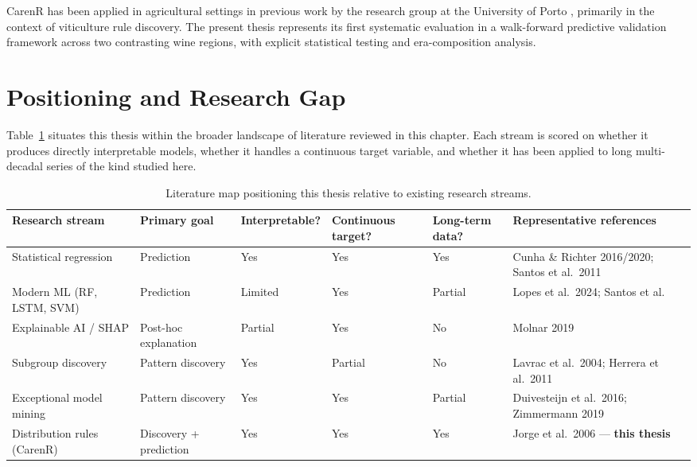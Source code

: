 CarenR has been applied in agricultural settings in previous work by the research group at the University of Porto \citep{Moreira2022}, primarily in the context of viticulture rule discovery. The present thesis represents its first systematic evaluation in a walk-forward predictive validation framework across two contrasting wine regions, with explicit statistical testing and era-composition analysis.


\section{Positioning and Research Gap}\label{sec:positioning_and_research_gap}

Table~\ref{tab:ch2a_1} situates this thesis within the broader landscape of literature reviewed in this chapter. Each stream is scored on whether it produces directly interpretable models, whether it handles a continuous target variable, and whether it has been applied to long multi-decadal series of the kind studied here.

\begin{table}[htbp]
  \centering
  \caption{Literature map positioning this thesis relative to existing research streams.}\label{tab:ch2a_1}
  \small
  \renewcommand{\arraystretch}{1.1}
  \begin{adjustbox}{max width=\textwidth}
  \begin{tabularx}{\textwidth}{>{\raggedright}p{2.6cm} >{\raggedright}p{2.1cm} >{\centering}p{2cm} >{\centering}p{1.9cm} >{\centering}p{1.7cm} X}
    \toprule
    \textbf{Research stream} & \textbf{Primary goal} & \textbf{Interpretable?} & \textbf{Continuous target?} & \textbf{Long-term data?} & \textbf{Representative references} \\
    \midrule
    Statistical regression  & Prediction              & Yes     & Yes     & Yes     & Cunha \& Richter 2016/2020; Santos et al.\ 2011 \\
    Modern ML (RF, LSTM, SVM) & Prediction            & Limited & Yes     & Partial & Lopes et al.\ 2024; Santos et al. \\
    Explainable AI / SHAP   & Post-hoc explanation    & Partial & Yes     & No      & Molnar 2019 \\
    Subgroup discovery      & Pattern discovery       & Yes     & Partial & No      & Lavrac et al.\ 2004; Herrera et al.\ 2011 \\
    Exceptional model mining & Pattern discovery      & Yes     & Yes     & Partial & Duivesteijn et al.\ 2016; Zimmermann 2019 \\
    Distribution rules (CarenR) & Discovery + prediction & Yes & Yes     & Yes     & Jorge et al.\ 2006 --- \textbf{this thesis} \\
    \bottomrule
  \end{tabularx}
  \end{adjustbox}

\end{table}


